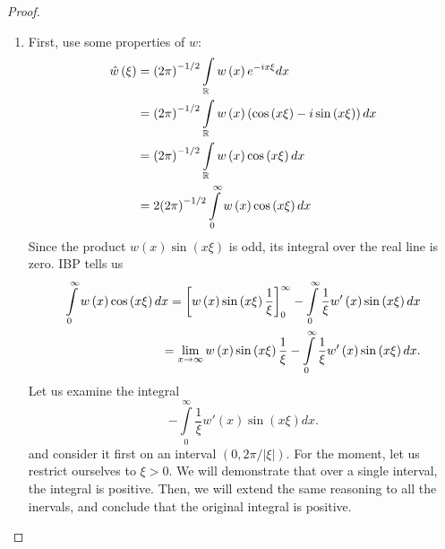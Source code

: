 \documentclass[letterpaper,twoside,11pt]{article}
\theoremstyle{mystyle}
\begin{document}
\begin{proof}
  \begin{enumerate}
    \item First, use some properties of $w$: 
    \begin{align*}
      \hat w\left( \xi  \right) &= {\left( {2\pi } \right)^{ - 1/2}}\int\limits_\mathbb{R} {w\left( x \right){e^{ - ix\xi }}dx}  \hfill \\
       &= {\left( {2\pi } \right)^{ - 1/2}}\int\limits_\mathbb{R} {w\left( x \right)\left( {\cos \left( {x\xi } \right) - i\sin \left( {x\xi } \right)} \right)dx}  \hfill \\
       &= {\left( {2\pi } \right)^{ - 1/2}}\int\limits_\mathbb{R} {w\left( x \right)\cos \left( {x\xi } \right)dx}  \hfill \\
       &= 2{\left( {2\pi } \right)^{ - 1/2}}\int\limits_0^\infty  {w\left( x \right)\cos \left( {x\xi } \right)dx}  
    \end{align*}
    Since the product $w(x)\sin(x\xi)$ is odd, its integral over the real line is zero. IBP tells us 
    \begin{align*}
        \int\limits_0^\infty  {w\left( x \right)\cos \left( {x\xi } \right)dx}  = \left[ {w\left( x \right)\sin \left( {x\xi } \right)\frac{1}{\xi }} \right]_0^\infty  - \int\limits_0^\infty  {\frac{1}{\xi }w'\left( x \right)\sin \left( {x\xi } \right)dx}  \hfill \\
         = \mathop {\lim }\limits_{x \to \infty } w\left( x \right)\sin \left( {x\xi } \right)\frac{1}{\xi } - \int\limits_0^\infty  {\frac{1}{\xi }w'\left( x \right)\sin \left( {x\xi } \right)dx}  .
    \end{align*}
    Let us examine the integral 
    \[ - \int\limits_0^\infty  {\frac{1}{\xi }w'\left( x \right)\sin \left( {x\xi } \right)dx} .\]
    and consider it first on an interval $(0, 2\pi / |\xi|)$. For the moment, let us restrict ourselves to $\xi > 0$. We will demonstrate that over a single interval, the integral is positive. Then, we will extend the same reasoning to all the inervals, and conclude that the original integral is positive. 


\end{enumerate}
\end{proof}
\end{document}
